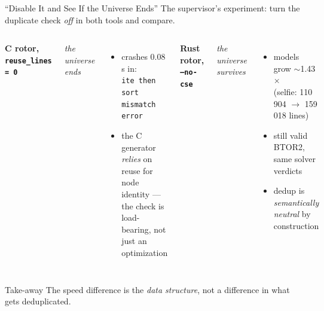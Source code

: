 \documentclass[aspectratio=169]{beamer}
\newcommand{\deflab}[2]{%
  \textbf{#1}\par\vspace{0.05cm}%
  {\color{blue!55!black}\itshape #2}\par\vspace{0.05cm}}
\newcommand{\flag}[1]{\texttt{\small #1}}
\begin{document}
\begin{frame}{``Disable It and See If the Universe Ends''}
  The supervisor's experiment: turn the duplicate check \emph{off} in
  both tools and compare.
  \vspace{0.1cm}
  \begin{columns}[T]
      \deflab{C rotor, \texttt{reuse\_lines = 0}}{the universe ends}
      \begin{itemize}\setlength\itemsep{0.25em}
        \item crashes 0.08\,s in:\\
              {\footnotesize\texttt{ite then sort mismatch error}}
        \item the C generator \emph{relies} on reuse for node identity
              --- the check is load-bearing, not just an optimization
      \end{itemize}
      \deflab{Rust rotor, \flag{--no-cse}}{the universe survives}
      \begin{itemize}\setlength\itemsep{0.25em}
        \item models grow $\sim$1.43$\times$\\
              {\footnotesize (selfie: 110\,904 $\to$ 159\,018 lines)}
        \item still valid BTOR2, same solver verdicts
        \item dedup is \emph{semantically neutral} by construction
      \end{itemize}
  \end{columns}
  \vspace{0.12cm}
  \begin{block}{Take-away}
    The speed difference is the \emph{data structure}, not a difference
    in what gets deduplicated.
  \end{block}
\end{frame}
\end{document}

